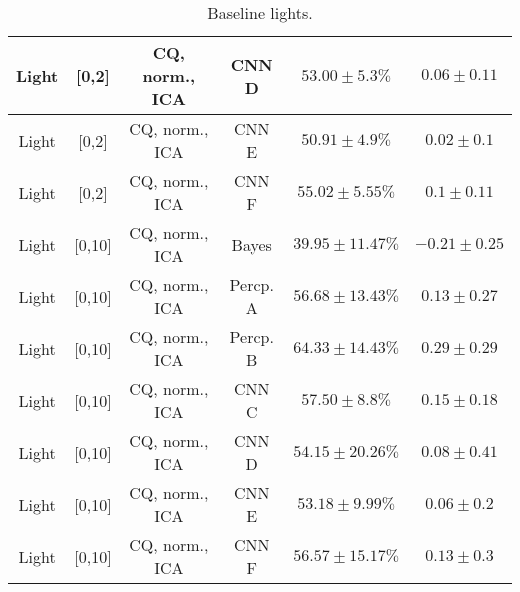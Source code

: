 \begin{table}[!htb]
{\begin{tabular}{c|c|c|c|c|c}
    \hline
    Light               & [0,2]                                         & CQ, norm., ICA            & CNN D                 &  $53.00 \pm 5.3\%$    & $0.06 \pm 0.11$\\  
    \hline
    Light               & [0,2]                                         & CQ, norm., ICA            & CNN E                 &  $50.91 \pm 4.9\%$    & $0.02 \pm 0.1$\\   
    \hline
    Light               & [0,2]                                         & CQ, norm., ICA            & CNN F                 &  $55.02 \pm 5.55\%$   & $0.1 \pm 0.11$\\   
    \hline
    Light               & [0,10]                                        & CQ, norm., ICA            & Bayes                 &  $39.95 \pm 11.47\%$  & $-0.21 \pm 0.25$\\ 
    \hline
    Light               & [0,10]                                        & CQ, norm., ICA            & Percp. A              &  $56.68 \pm 13.43\%$  & $0.13 \pm 0.27$\\  
    \hline
    Light               & [0,10]                                        & CQ, norm., ICA            & Percp. B              &  $64.33 \pm 14.43\%$  & $0.29 \pm 0.29$\\  
    \hline
    Light               & [0,10]                                        & CQ, norm., ICA            & CNN C                 &  $57.50 \pm 8.8\%$    & $0.15 \pm 0.18$\\  
    \hline
    Light               & [0,10]                                        & CQ, norm., ICA            & CNN D                 &  $54.15 \pm 20.26\%$  & $0.08 \pm 0.41$\\  
    \hline
    Light               & [0,10]                                        & CQ, norm., ICA            & CNN E                 &  $53.18 \pm 9.99\%$   & $0.06 \pm 0.2$\\  
    \hline
    Light               & [0,10]                                        & CQ, norm., ICA            & CNN F                 &  $56.57 \pm 15.17\%$  & $0.13 \pm 0.3$\\  
    \hline
\end{tabular}
}
\caption{Baseline lights.}
\label{tab:lights-baseline-app}
\end{table}
